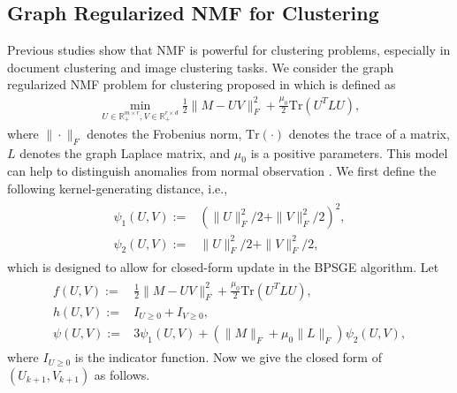 \documentclass[letterpaper]{article} %
\begin{document}
	\subsection{Graph Regularized NMF for Clustering}
	Previous studies \cite{Cai11GNMF, ShahnazBPP06, AhmedHAD21}  show that NMF is  powerful for clustering problems, especially in document clustering and image clustering tasks. 
	We consider the   graph regularized NMF problem for clustering proposed in \cite{Cai11GNMF} which is defined as 
	\begin{eqnarray}
		\min_{U\in\mathbb{R}^{m\times r}_{+},V\in\mathbb{R}^{r\times d}_{+}} \frac{1}{2}\|M-UV\|_{F}^{2}+\frac{\mu_{0}}{2}\text{Tr}(U^{T}LU), \label{GNMF}
	\end{eqnarray}
	where   $\|\cdot\|_{F}$ denotes the Frobenius norm, $\text{Tr}(\cdot)$ denotes the trace of a matrix, $L$ denotes the graph Laplace matrix,  and $\mu_{0}$ is a positive parameters. 
	This model can help to distinguish anomalies from normal observation \cite{AhmedHAD21}. 
	We first define the following  kernel-generating distance, i.e.,
	\begin{eqnarray}
		\begin{aligned}
			\psi_{1}(U,V):=&\left(\|U\|_{F}^{2}/2+\|V\|_{F}^{2}/2\right)^{2},\\ \psi_{2}(U,V):=&\|U\|_{F}^{2}/2+\|V\|_{F}^{2}/2, 
		\end{aligned}\label{kernels}
	\end{eqnarray}
	which is designed to allow for closed-form update in the BPSGE algorithm. 
	Let 
	\begin{eqnarray}
		\begin{aligned}
			f(U,V):=&\frac{1}{2}\|M-UV\|_{F}^{2}+\frac{\mu_{0}}{2}\text{Tr}(U^{T}LU),\\
			h(U,V):=&I_{U\ge 0}+I_{V\ge 0},\\
			\psi(U,V):=&3\psi_{1}(U,V)+(\|M\|_{F}+\mu_{0}\|L\|_{F})\psi_{2}(U,V),
		\end{aligned}\label{fh_def_01}
	\end{eqnarray}
	where $I_{U\ge0}$ is the indicator function. 
	Now we give the closed form of $(U_{k+1},V_{k+1})$ as follows.
\end{document}
